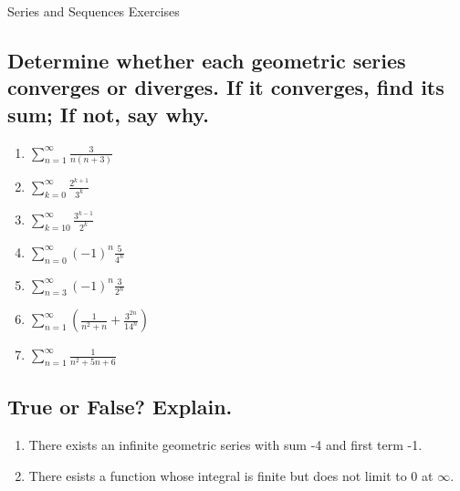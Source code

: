 \documentclass{article}
\begin{document}
\begin{center}
\begin{Huge}Series and Sequences Exercises\end{Huge}
\end{center}


\subsection{Determine whether each geometric series converges or diverges. If it converges, find its sum; If not, say why.}

\begin{multicols}{3}
\begin{enumerate}
\item $\displaystyle \sum_{n=1}^\infty \frac{3}{n(n+3)}$
\item $\displaystyle \sum_{k=0}^{\infty} \frac{2^{k+1}}{3^k}$
\item $\displaystyle \sum_{k=10}^{\infty} \frac{3^{k-1}}{2^k}$
\item $\displaystyle \sum_{n=0}^{\infty}(-1)^n \frac{5}{4^n}$
\item $\displaystyle \sum_{n=3}^{\infty}(-1)^n \frac{3}{2^n}$
\item $\displaystyle \sum_{n=1}^{\infty}\left( \frac{1}{n^2+n} + \frac{3^{2n}}{14^n}\right)$
\item $\displaystyle\sum_{n=1}^{\infty}\frac{1}{n^{2}+5n+6}$
\end{enumerate}
\end{multicols}

\subsection{True or False? Explain.}
\begin{enumerate}
\item There exists an infinite geometric series with sum -4 and first term -1.
\item There esists a function whose integral is finite but does not limit to 0 at $\infty$.
\end{enumerate}
\end{document}
